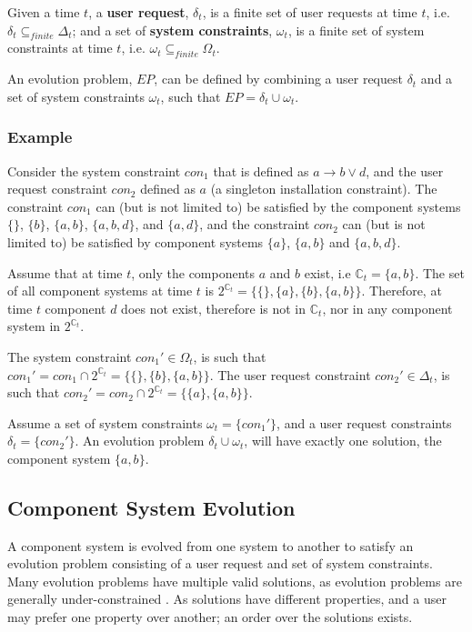 \begin{defs}
Given a time $t$, a \textbf{user request}, $\delta_{t}$, is a finite set of user requests at time $t$, i.e. $\delta_{t} \subseteq_{finite} \Delta_{t}$;
and a set of \textbf{system constraints}, $\omega_{t}$, is a finite set of system constraints at time $t$, i.e. $\omega_{t} \subseteq_{finite} \Omega_{t}$.  
\end{defs}

An evolution problem, $EP$, can be defined by combining a user request $\delta_{t}$ and a set of system constraints $\omega_{t}$, such that $EP = \delta_{t} \cup \omega_{t}$.

\subsubsection{Example}
Consider the system constraint $con_1$ that is defined as $a \rightarrow b \vee d$, and the user request constraint $con_2$ defined as $a$ (a singleton installation constraint).
The constraint $con_1$ can (but is not limited to) be satisfied by the component systems $\{\}$, $\{b\}$, $\{a,b\}$, $\{a,b,d\}$, and $\{a,d\}$,
and the constraint $con_2$ can (but is not limited to) be satisfied by component systems $\{a\}$, $\{a,b\}$ and $\{a,b,d\}$.

Assume that at time $t$, only the components $a$ and $b$ exist, i.e $\mathbb{C}_{t} = \{a,b\}$.
The set of all component systems at time $t$ is $2^{\mathbb{C}_{t}} = \{\{\},\{a\},\{b\},\{a,b\}\}$.
Therefore, at time $t$ component $d$ does not exist, therefore is not in $\mathbb{C}_{t}$, nor in any component system in $2^{\mathbb{C}_{t}}$.

The system constraint $con_1' \in \Omega_{t}$, is such that $con_1' = con_1 \cap 2^{\mathbb{C}_{t}} = \{\{\},\{b\},\{a,b\}\}$.
The user request constraint $con_2' \in \Delta_{t}$, is such that $con_2' = con_2 \cap 2^{\mathbb{C}_{t}} = \{\{a\},\{a,b\}\}$.

Assume a set of system constraints $\omega_{t} = \{con_1'\}$, and a user request constraints $\delta_{t} = \{con_2'\}$.
An evolution problem $\delta_{t} \cup \omega_{t}$, will have exactly one solution, the component system $\{a,b\}$.  

\subsection{Component System Evolution}
\label{formal.evo}
A component system is evolved from one system to another to satisfy an evolution problem consisting of a user request and set of system constraints.
Many evolution problems have multiple valid solutions, as evolution problems are generally under-constrained \citep{Berre2008}.
As solutions have different properties, and a user may prefer one property over another; an order over the solutions exists.  

